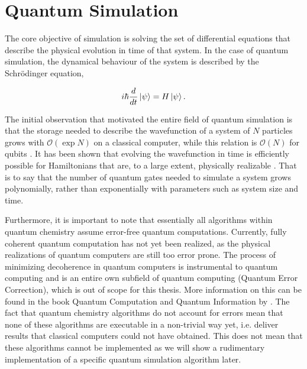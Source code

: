 \section{Quantum Simulation}

The core objective of simulation is solving the set of differential equations that describe the physical evolution in time of that system. In the case of quantum simulation, the dynamical behaviour of the system is described by the Schrödinger equation,

$$ i \hbar \frac{d}{dt} \left\vert{\psi}\right\rangle = H \left\vert{\psi}\right\rangle.$$


The initial observation that motivated the entire field of quantum simulation is that the storage needed to describe the wavefunction of a system of $N$ particles grows with $\mathcal{O}(\exp{N})$ on a classical computer, while this relation is $\mathcal{O}(N)$ for qubits \cite{cao}. It has been shown that evolving the wavefunction in time is efficiently possible for Hamiltonians that are, to a large extent, physically realizable \cite{cao}. That is to say that the number of quantum gates needed to simulate a system grows polynomially, rather than exponentially with parameters such as system size and time.

\vspace{5mm}


 Furthermore, it is important to note that essentially all algorithms within quantum chemistry assume error-free quantum computations. Currently, fully coherent quantum computation has not yet been realized, as the physical realizations of quantum computers are still too error prone. The process of minimizing decoherence in quantum computers is instrumental to quantum computing and is an entire own subfield of quantum computing (Quantum Error Correction), which is out of scope for this thesis. More information on this can be found in the book Quantum Computation and Quantum Information by \textcite{nielsen}. The fact that quantum chemistry algorithms do not account for errors mean that none of these algorithms are executable in a non-trivial way yet, i.e. deliver results that classical computers could not have obtained. This does not mean that these algorithms cannot be implemented as we will show a rudimentary implementation of a specific quantum simulation algorithm later.

\vspace{5mm}

